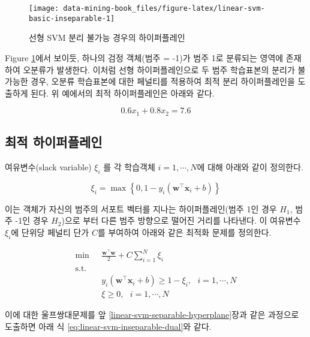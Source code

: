\documentclass[
]{book}
\begin{document}
\begin{figure}

{\centering \texttt{[image: data-mining-book\_files/figure-latex/linear-svm-basic-inseparable-1]} 

}

\caption{선형 SVM 분리 불가능 경우의 하이퍼플레인}\label{fig:linear-svm-basic-inseparable}
\end{figure}

Figure \ref{fig:linear-svm-basic-inseparable}에서 보이듯, 하나의 검정 객체(범주 = -1)가 범주 1로 분류되는 영역에 존재하여 오분류가 발생한다. 이처럼 선형 하이퍼플레인으로 두 범주 학습표본의 분리가 불가능한 경우, 오분류 학습표본에 대한 페널티를 적용하여 최적 분리 하이퍼플레인을 도출하게 된다. 위 예에서의 최적 하이퍼플레인은 아래와 같다.

\[
0.6 x_{1} + 0.8 x_{2} = 7.6
\]

\hypertarget{linear-svm-inseparable-hyperplane}{%
\subsection{최적 하이퍼플레인}\label{linear-svm-inseparable-hyperplane}}

여유변수(slack variable) \(\xi_i\) 를 각 학습객체 \(i = 1, \cdots, N\)에 대해 아래와 같이 정의한다.

\begin{equation*}
\xi_i = \max \left\{ 0, 1 - y_i (\mathbf{w}^\top \mathbf{x}_i + b) \right\}
\end{equation*}

이는 객체가 자신의 범주의 서포트 벡터를 지나는 하이퍼플레인(범주 1인 경우 \(H_1\), 범주 -1인 경우 \(H_2\))으로 부터 다른 범주 방향으로 떨어진 거리를 나타낸다. 이 여유변수 \(\xi_i\)에 단위당 페널티 단가 \(C\)를 부여하여 아래와 같은 최적화 문제를 정의한다.

\begin{equation*}
\begin{split}
\min \text{  } & \frac{\mathbf{w}^\top \mathbf{w}}{2} + C \sum_{i = 1}^{N} \xi_i \\
\text{s.t.}& \\
& y_i \left( \mathbf{w}^\top \mathbf{x}_i + b \right) \ge 1 - \xi_i, \text{  } i = 1, \cdots, N \\
& \xi \ge 0, \text{  } i = 1, \cdots, N
\end{split}
\end{equation*}

이에 대한 울프쌍대문제를 앞 \ref{linear-svm-separable-hyperplane}장과 같은 과정으로 도출하면 아래 식 \eqref{eq:linear-svm-inseparable-dual}와 같다.
\end{document}
